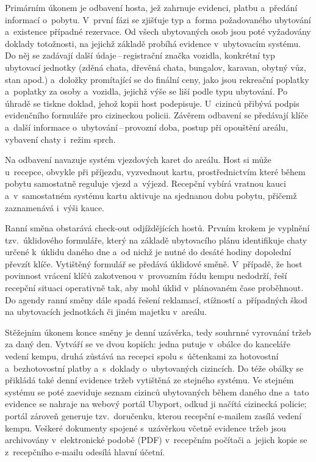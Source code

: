 Primárním úkonem je odbavení hosta, jež zahrnuje evidenci, platbu a~předání informací o~pobytu.
V~první fázi se zjišťuje typ a~forma požadovaného ubytování a~existence případné rezervace.
Od všech ubytovaných osob jsou poté vyžadovány doklady totožnosti, na jejichž základě probíhá evidence v~ubytovacím systému.
Do něj se zadávají další údaje\,--\,registrační značka vozidla, konkrétní typ ubytovací jednotky (zděná chata, dřevěná chata, bungalov, karavan, obytný vůz, stan apod.) a~doložky promítající se do finální ceny, jako jsou rekreační poplatky a~poplatky za osoby a~vozidla, jejichž výše se liší podle typu ubytování.
Po úhradě se tiskne doklad, jehož kopii host podepisuje.
U~cizinců přibývá podpis evidenčního formuláře pro cizineckou policii.
Závěrem odbavení se předávají klíče a~další informace o~ubytování\,--\,provozní doba, postup při opouštění areálu, vybavení chaty i~režim sprch.

Na odbavení navazuje systém vjezdových karet do areálu.
Host si může u~recepce, obvykle při příjezdu, vyzvednout kartu, prostřednictvím které během pobytu samostatně reguluje vjezd a~výjezd.
Recepční vybírá vratnou kauci a~v~samostatném systému kartu aktivuje na sjednanou dobu pobytu, přičemž zaznamenává i~výši kauce.

Ranní směna obstarává check-out odjíždějících hostů.
Prvním krokem je vyplnění tzv.\ úklidového formuláře, který na základě ubytovacího plánu identifikuje chaty určené k~úklidu daného dne a~od nichž je nutné do desáté hodiny dopolední převzít klíče.
Vytištěný formulář se předává úklidové směně.
V~případě, že host povinnost vrácení klíčů zakotvenou v~provozním řádu kempu nedodrží, řeší recepční situaci operativně tak, aby mohl úklid v~plánovaném čase proběhnout.
Do agendy ranní směny dále spadá řešení reklamací, stížností a~případných škod na ubytovacích jednotkách či jiném majetku v~areálu.

Stěžejním úkonem konce směny je denní uzávěrka, tedy souhrnné vyrovnání tržeb za daný den.
Vytváří se ve dvou kopiích: jedna putuje v~obálce do kanceláře vedení kempu, druhá zůstává na recepci spolu s~účtenkami za hotovostní a~bezhotovostní platby a~s~doklady o~ubytovaných cizincích.
Do téže obálky se přikládá také denní evidence tržeb vytištěná ze stejného systému.
Ve stejném systému se poté zaeviduje seznam cizinců ubytovaných během daného dne a~tato evidence se nahraje na webový portál Ubyport, odkud ji načítá cizinecká policie; portál zároveň generuje tzv.~doručenku, kterou recepční e-mailem zasílá vedení kempu.
Veškeré dokumenty spojené s~uzávěrkou včetně evidence tržeb jsou archivovány v~elektronické podobě (PDF) v~recepčním počítači a~jejich kopie se z~recepčního e-mailu odesílá hlavní účetní.

